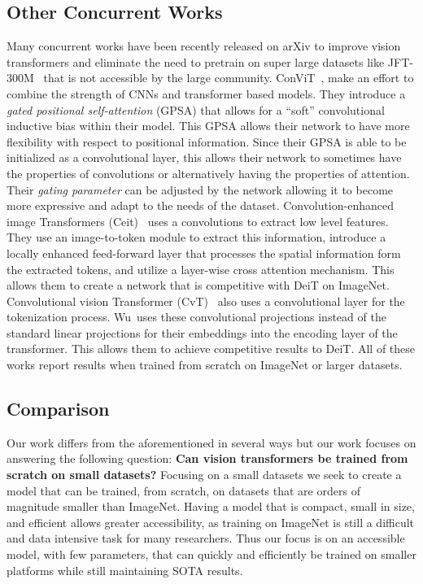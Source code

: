 \documentclass[10pt,twocolumn,letterpaper]{article}
\begin{document}
\subsection{Other Concurrent Works}
Many concurrent works have been recently released on arXiv to improve vision transformers and eliminate the need to pretrain on super large datasets like JFT-300M~\cite{sun2017revisiting} that is not accessible by the large community. ConViT~\cite{d2021convit}, make an effort to combine the strength of CNNs and transformer based models. 
They introduce a \textit{gated positional self-attention} (GPSA) that allows for a ``soft'' convolutional inductive bias within their model. 
This GPSA allows their network to have more flexibility with respect to positional information. 
Since their GPSA is able to be initialized as a convolutional layer, this allows their network to sometimes have the properties of convolutions or alternatively having the properties of attention. 
Their \textit{gating parameter} can be adjusted by the network allowing it to become more expressive and adapt to the needs of the dataset.
Convolution-enhanced image Transformers (Ceit)~\cite{yuan2021incorporating} uses a convolutions to extract low level features. 
They use an image-to-token module to extract this information, introduce a locally enhanced feed-forward layer that processes the spatial information form the extracted tokens, and utilize a layer-wise cross attention mechanism. 
This allows them to create a network that is competitive with DeiT on ImageNet. 
Convolutional vision Transformer (CvT)~\cite{wu2021cvt} also uses a convolutional layer for the tokenization process. 
Wu~\etal uses these convolutional projections instead of the standard linear projections for their embeddings into the encoding layer of the transformer.
This allows them to achieve competitive results to DeiT. 
All of these works report results when trained from scratch on ImageNet or larger datasets.


\subsection{Comparison}

Our work differs from the aforementioned in several ways but our work focuses on answering the following question: \textbf{Can vision transformers be trained from scratch on small datasets?} 
Focusing on a small datasets we seek to create a model that can be trained, from scratch, on datasets that are orders of magnitude smaller than ImageNet.
Having a model that is compact, small in size, and efficient allows greater accessibility, as training on ImageNet is still a difficult and data intensive task for many researchers. 
Thus our focus is on an accessible model, with few parameters, that can quickly and efficiently be trained on smaller platforms while still maintaining SOTA results. 
\end{document}
